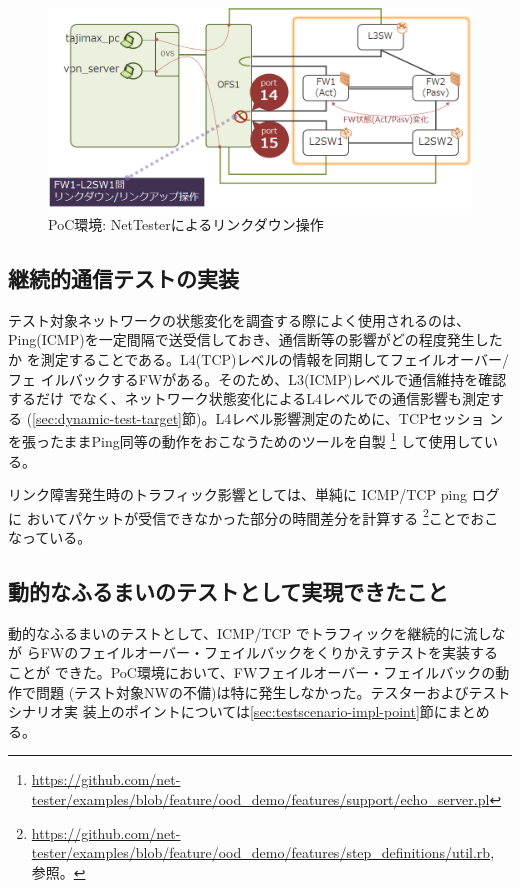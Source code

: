 \begin{figure}[h]
 \centering
 \includegraphics[scale=0.6]{img/poc-env-linkdown.png}
 \caption{PoC環境: NetTesterによるリンクダウン操作}
 \label{fig:poc-env-linkdown}
\end{figure}

  \subsection{継続的通信テストの実装}

テスト対象ネットワークの状態変化を調査する際によく使用されるのは、
Ping(ICMP)を一定間隔で送受信しておき、通信断等の影響がどの程度発生したか
を測定することである。L4(TCP)レベルの情報を同期してフェイルオーバー/フェ
イルバックするFWがある。そのため、L3(ICMP)レベルで通信維持を確認するだけ
でなく、ネットワーク状態変化によるL4レベルでの通信影響も測定する
(\ref{sec:dynamic-test-target}節)。L4レベル影響測定のために、TCPセッショ
ンを張ったままPing同等の動作をおこなうためのツールを自製
\footnote{\url{https://github.com/net-tester/examples/blob/feature/ood_demo/features/support/echo_server.pl}}
して使用している。

リンク障害発生時のトラフィック影響としては、単純に ICMP/TCP ping ログに
おいてパケットが受信できなかった部分の時間差分を計算する
\footnote{\url{https://github.com/net-tester/examples/blob/feature/ood_demo/features/step_definitions/util.rb},
参照。}ことでおこなっている。

  \subsection{動的なふるまいのテストとして実現できたこと}
  \label{sec:dynamic-test-result}

動的なふるまいのテストとして、ICMP/TCP でトラフィックを継続的に流しなが
らFWのフェイルオーバー・フェイルバックをくりかえすテストを実装することが
できた。PoC環境において、FWフェイルオーバー・フェイルバックの動作で問題
(テスト対象NWの不備)は特に発生しなかった。テスターおよびテストシナリオ実
装上のポイントについては\ref{sec:testscenario-impl-point}節にまとめる。

